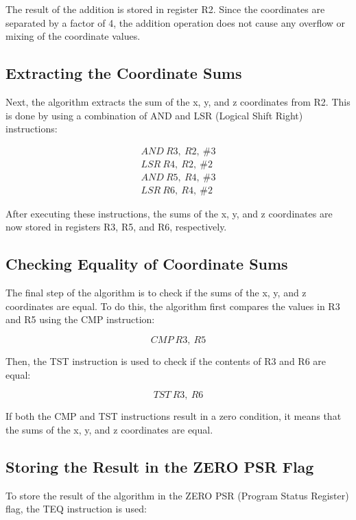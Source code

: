 The result of the addition is stored in register R2. Since the coordinates are separated by a factor of 4, the addition operation does not cause any overflow or mixing of the coordinate values.

\subsection{Extracting the Coordinate Sums}

Next, the algorithm extracts the sum of the x, y, and z coordinates from R2. This is done by using a combination of AND and LSR (Logical Shift Right) instructions:

\begin{align}
  AND\ R3,\ R2,\ \#3    \\
  LSR\ R4,\ R2,\ \#2    \\
  AND\ R5,\ R4,\ \#3    \\
  LSR\ R6,\ R4,\ \#2
\end{align}

After executing these instructions, the sums of the x, y, and z coordinates are now stored in registers R3, R5, and R6, respectively.

\subsection{Checking Equality of Coordinate Sums}

The final step of the algorithm is to check if the sums of the x, y, and z coordinates are equal. To do this, the algorithm first compares the values in R3 and R5 using the CMP instruction:

\begin{equation}
  CMP\ R3,\ R5
\end{equation}

Then, the TST instruction is used to check if the contents of R3 and R6 are equal:

\begin{equation}
  TST\ R3,\ R6
\end{equation}

If both the CMP and TST instructions result in a zero condition, it means that the sums of the x, y, and z coordinates are equal.

\subsection{Storing the Result in the ZERO PSR Flag}

To store the result of the algorithm in the ZERO PSR (Program Status Register) flag, the TEQ instruction is used:

